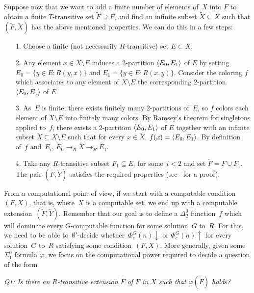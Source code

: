 Suppose now that we want to add a finite number of elements of~$X$ into $F$ to obtain
a finite $T$-transitive set $\tilde{F} \supseteq F$,
and find an infinite subset $\tilde{X} \subseteq X$ such that $(\tilde{F}, \tilde{X})$
has the above mentioned properties. We can do this in a few steps:

\begin{itemize}
	\item[1.] Choose a finite (not necessarily $R$-transitive) set $E \subset X$.
	\item[2.] Any element $x \in X \setminus E$ induces a 2-partition $\left\langle E_0, E_1 \right\rangle$ of $E$
	by setting $E_0 = \{y \in E : R(y, x) \}$ and $E_1 = \{y \in E : R(x, y)\}$.
	Consider the coloring $f$ which associates to any element of $X \setminus E$ the corresponding 2-partition $\left\langle E_0, E_1 \right\rangle$ of $E$.
	\item[3.]
	As~$E$ is finite, there exists finitely many 2-partitions of~$E$, so $f$ colors each element of $X \setminus E$ into
	finitely many colors. By Ramsey's theorem for singletons applied to~$f$, there exists a 2-partition $\left\langle E_0, E_1 \right\rangle$ of $E$
	together with an infinite subset $\tilde{X} \subseteq X \setminus E$ such that for every $x \in \tilde{X}$, $f(x) = \left\langle E_0, E_1 \right\rangle$.
	By definition of~$f$ and~$E_i$, $E_0 \to_R \tilde{X} \to_R E_1$.
	
	\item[4.] Take any $R$-transitive subset $F_1 \subseteq E_i$ for some~$i < 2$ and set $\tilde{F} = F \cup F_1$.
	The pair $(\tilde{F}, \tilde{Y})$ satisfies the required properties (see~\cite[Lemma 5.9]{Patey2015Degrees} for a proof).
\end{itemize}

From a computational point of view, if we start with a computable condition~$(F, X)$, that is, where~$X$ is a computable set,
we end up with a computable extension~$(\tilde{F}, \tilde{Y})$.
Remember that our goal is to define a $\Delta^0_2$ function~$f$ which will dominate every $G$-computable function
for some solution~$G$ to~$R$. For this, we need to be able to~$\emptyset'$-decide
whether~$\Phi^G_e(n) \downarrow$ or $\Phi^G_e(n) \uparrow$ for every solution~$G$ to~$R$ satisfying 
some condition~$(F, X)$. 
More generally, given some~$\Sigma^0_1$ formula $\varphi$, we focus on the computational power required to decide a question of the form

\smallskip
{\itshape
Q1: Is there an $R$-transitive extension $\tilde{F}$ of $F$ in $X$ such that $\varphi(\tilde{F})$ holds?
}
\smallskip


